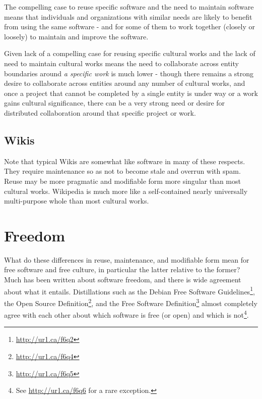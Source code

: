 The compelling case to reuse specif\hbox{}ic software and the need to maintain
software means that individuals and organizations with similar needs are likely
to benef\hbox{}it from using the same software - and for some of them to work
together (closely or loosely) to maintain and improve the software.

Given lack of a compelling case for reusing specif\hbox{}ic cultural works and
the lack of need to maintain cultural works means the need to collaborate across
entity boundaries around \textit{a specif\hbox{}ic work} is much lower - though
there remains a strong desire to collaborate across entities around any number
of cultural works, and once a project that cannot be completed by a single
entity is under way or a work gains cultural signif\hbox{}icance, there can be a
very strong need or desire for distributed collaboration around that
specif\hbox{}ic project or work.


\subsection{Wikis}
\label{ss:free_culture_software_freedom:obvious_software:wikis}

Note that typical Wikis are somewhat like software in many of these respects.
They require maintenance so as not to become stale and overrun with spam. Reuse
may be more pragmatic and modif\hbox{}iable form more singular than most
cultural works. Wikipedia is much more like a self-contained nearly universally
multi-purpose whole than most cultural works.


\section{Freedom}
\label{s:free_culture_software_freedom:freedom}

What do these dif\hbox{}ferences in reuse, maintenance, and modif\hbox{}iable
form mean for free software and free culture, in particular the latter relative
to the former?  Much has been written about software freedom, and there is wide
agreement about what it entails. Distillations such as the Debian Free Software
Guidelines\footnote{\url{http://ur1.ca/f6q2}}, the Open Source
Def\hbox{}inition\footnote{\url{http://ur1.ca/f6q4}}, and the Free Software
Def\hbox{}inition\footnote{\url{http://ur1.ca/f6q5}} almost completely agree
with each other about which software is free (or open) and which is
not\footnote{See \url{http://ur1.ca/f6q6} for a rare exception.}.

